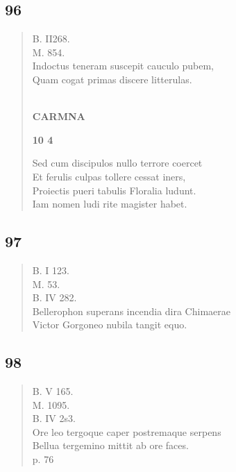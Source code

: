 \documentclass[11pt, a4paper]{report}
\begin{document}
            \subsection*{96}
      \begin{verse}
      B. II268. \\ M. 854. \\ Indoctus teneram suscepit cauculo pubem, \\ Quam cogat primas discere litterulas. \\ 
        ﻿\pagebreak 
    \begin{center} \textbf{CARMNA} \end{center}\begin{center} \textbf{10 4} \end{center}Sed cum discipulos nullo terrore coercet \\ Et ferulis culpas tollere cessat iners, \\ Proiectis pueri tabulis Floralia ludunt. \\ Iam nomen ludi rite magister habet. \\ 
      \end{verse}
  
            \subsection*{97}
      \begin{verse}
      B. I 123. \\ M. 53. \\ B. IV 282. \\ Bellerophon superans incendia dira Chimaerae \\ Victor Gorgoneo nubila tangit equo. \\ 
      \end{verse}
  
            \subsection*{98}
      \begin{verse}
      B. V 165. \\ M. 1095. \\ B. IV 2s3. \\ Ore leo tergoque caper postremaque serpens \\ Bellua tergemino mittit ab ore faces. \\ p. 76 \\ 
      \end{verse}
  
\end{document}
